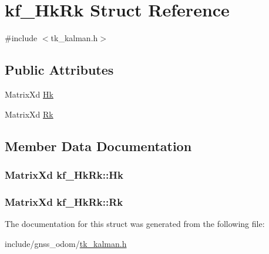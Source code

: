 \hypertarget{structkf___hk_rk}{\section{kf\-\_\-\-Hk\-Rk Struct Reference}
\label{structkf___hk_rk}
}


{\ttfamily \#include $<$tk\-\_\-kalman.\-h$>$}

\subsection*{Public Attributes}
\begin{DoxyCompactItemize}
\item 
Matrix\-Xd \hyperlink{structkf___hk_rk_a1ddb36bcbcac2ed9b34b2b48317b96e9}{Hk}
\item 
Matrix\-Xd \hyperlink{structkf___hk_rk_a6d385575862d961f51c5296b9df210d2}{Rk}
\end{DoxyCompactItemize}


\subsection{Member Data Documentation}
\hypertarget{structkf___hk_rk_a1ddb36bcbcac2ed9b34b2b48317b96e9}{
\subsubsection[{Hk}]{\setlength{\rightskip}{0pt plus 5cm}Matrix\-Xd kf\-\_\-\-Hk\-Rk\-::\-Hk}}\label{structkf___hk_rk_a1ddb36bcbcac2ed9b34b2b48317b96e9}
\hypertarget{structkf___hk_rk_a6d385575862d961f51c5296b9df210d2}{
\subsubsection[{Rk}]{\setlength{\rightskip}{0pt plus 5cm}Matrix\-Xd kf\-\_\-\-Hk\-Rk\-::\-Rk}}\label{structkf___hk_rk_a6d385575862d961f51c5296b9df210d2}


The documentation for this struct was generated from the following file\-:\begin{DoxyCompactItemize}
\item 
include/gnss\-\_\-odom/\hyperlink{tk__kalman_8h}{tk\-\_\-kalman.\-h}\end{DoxyCompactItemize}
